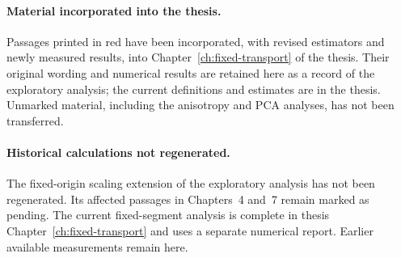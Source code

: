 \paragraph{Material incorporated into the thesis.}
Passages printed in \textcolor{red!70!black}{red} have been incorporated, with revised
estimators and newly measured results, into Chapter~\ref{ch:fixed-transport} of the
thesis. Their original wording and numerical results are retained here as a record
of the exploratory analysis; the current definitions and estimates are in the thesis.
Unmarked material, including the anisotropy and PCA analyses, has not been transferred.

\ifscalingresultsready\else
\paragraph{Historical calculations not regenerated.}
The fixed-origin scaling extension of the exploratory analysis has not been
regenerated. Its affected passages in Chapters~4 and~7 remain marked as pending.
The current fixed-segment analysis is complete in thesis Chapter~\ref{ch:fixed-transport}
and uses a separate numerical report. Earlier available measurements remain here.
\fi

\begingroup
\small
\tableofcontents
\endgroup
\clearpage
{}
\setcounter{chapter}{2}

\begingroup
\raggedbottom
\setlength{\parskip}{4pt plus 1pt minus 1pt}


\endgroup







\appendix
\renewcommand{\thechapter}{4.\Alph{chapter}}
\renewcommand{\theHchapter}{4.\Alph{chapter}}


